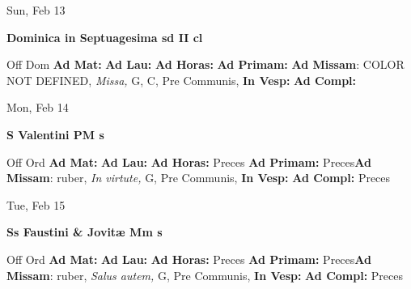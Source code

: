 \documentclass[10pt]{book}
\begin{document}
\begin{center}
\begin{minipage}{3.5in}
\vspace{2em}
\begin{center}Sun, Feb 13
\end{center}
\textbf{ \large Dominica in Septuagesima
\textnormal{\normalsize sd II cl}}

\begin{justify}Off Dom
\textbf{Ad Mat: }
\textbf{Ad Lau: }
\textbf{Ad Horas: }
\textbf{Ad Primam: }\textbf{Ad Missam}: COLOR NOT DEFINED, \textit{Missa,} G, C, Pre Communis, 
\textbf{In Vesp: }
\textbf{Ad Compl: }
\end{justify}
\end{minipage}
\end{center}

\begin{center}
\begin{minipage}{3.5in}
\vspace{2em}
\begin{center}Mon, Feb 14
\end{center}
\textbf{ \large S Valentini PM
\textnormal{\normalsize s}}

\begin{justify}Off Ord
\textbf{Ad Mat: }
\textbf{Ad Lau: }
\textbf{Ad Horas: }Preces
\textbf{Ad Primam: }Preces\textbf{Ad Missam}: ruber, \textit{In virtute,} G, Pre Communis, 
\textbf{In Vesp: }
\textbf{Ad Compl: }Preces
\end{justify}
\end{minipage}
\end{center}

\begin{center}
\begin{minipage}{3.5in}
\vspace{2em}
\begin{center}Tue, Feb 15
\end{center}
\textbf{ \large Ss Faustini \& Jovitæ Mm
\textnormal{\normalsize s}}

\begin{justify}Off Ord
\textbf{Ad Mat: }
\textbf{Ad Lau: }
\textbf{Ad Horas: }Preces
\textbf{Ad Primam: }Preces\textbf{Ad Missam}: ruber, \textit{Salus autem,} G, Pre Communis, 
\textbf{In Vesp: }
\textbf{Ad Compl: }Preces
\end{justify}
\end{minipage}
\end{center}
\end{document}
